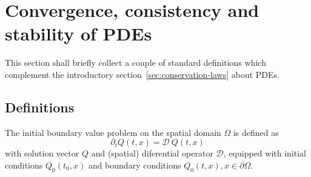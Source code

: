 \section{Convergence, consistency and stability of 
PDEs}\label{sec:apx-pde-classification}
This section shall briefly collect a couple of standard definitions
which complement the introductory section~\vref{sec:conservation-laws}
about PDEs.

\subsection*{Definitions}

The initial boundary value problem on the spatial domain $\Omega$ is defined as
\begin{equation}\label{sec:apx-defs-ibvp}
\partial_t Q(t,x) = \mathcal D~Q(t,x)
\end{equation}
with solution vector $Q$ and (spatial) diferential operator $\mathcal D$,
equipped with initial conditions $Q_0(t_0,x)$ and boundary conditions
$Q_0(t,x), x\in\partial\Omega$.

